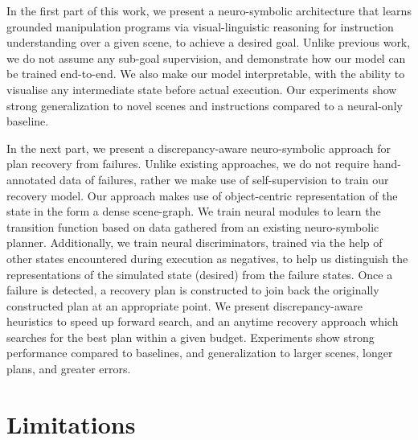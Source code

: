 In the first part of this work, we present a neuro-symbolic architecture that learns grounded manipulation programs via visual-linguistic reasoning for instruction understanding over a given scene, to achieve a desired goal. Unlike previous work, we do not assume any sub-goal supervision, and demonstrate how our model can be trained end-to-end. We also make our model interpretable, with the ability to visualise any intermediate state before actual execution. Our experiments show strong generalization to novel scenes and instructions compared to a neural-only baseline.

In the next part, we present a discrepancy-aware neuro-symbolic approach for plan recovery from failures. Unlike existing approaches, we do not require hand-annotated data of failures, rather we make use of self-supervision to train our recovery model. Our approach makes use of object-centric representation of the state in the form a dense scene-graph. We train neural modules to learn the transition function based on data gathered from an existing neuro-symbolic planner. Additionally, we train neural discriminators, trained via the help of other states encountered during execution as negatives, to help us distinguish the representations of the simulated state (desired) from the failure states. Once a failure is detected, a recovery plan is constructed to join back the originally constructed plan at an appropriate point. We present discrepancy-aware heuristics to speed up forward search, and an anytime recovery approach which searches for the best plan within a given budget. Experiments show strong performance compared to baselines, and generalization to larger scenes, longer plans, and greater errors. 

\section{Limitations}

